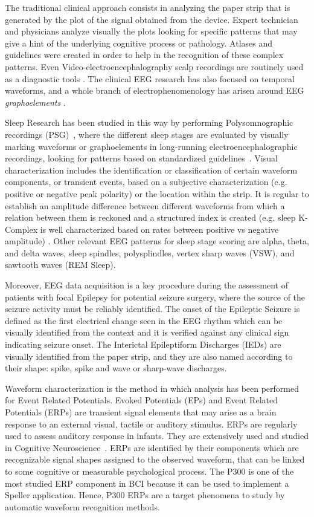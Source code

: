 \documentclass[brainsci,article,submit,moreauthors,pdftex,10pt,a4paper]{mdpi}
\begin{document}
The traditional clinical approach consists in analyzing the paper strip that is generated by the plot of the signal obtained from the device.  Expert technician and physicians analyze visually the plots looking for specific patterns that may give a hint of the underlying cognitive process or pathology.   Atlases and guidelines were created in order to help in the recognition of these complex patterns.   Even Video-electroencephalography scalp recordings are routinely used as a diagnostic tools \citep{Giagante2003} .  The clinical EEG research has also focused on temporal waveforms, and a whole branch of electrophenomenology has arisen around EEG \textit{graphoelements} \citep{Schomer2010}.  

Sleep Research has been studied in this way by performing Polysomnographic recordings (PSG)~\citep{Boostani2017,Rodenbeck2006}, where the different sleep stages are evaluated by visually marking waveforms or graphoelements in long-running electroencephalographic recordings, looking for patterns based on standardized guidelines~\citep{Dimitriadis2018}. Visual characterization includes the identification or classification of certain waveform components, or transient events, based on a subjective characterization (e.g. positive or negative peak polarity) or the location within the strip.  It is regular to establish an amplitude difference between different waveforms from which a relation between them is reckoned and a structured index is created (e.g. sleep K-Complex is well characterized based on rates between positive vs negative amplitude) \citep{Uchida1999}.  Other relevant EEG patterns for sleep stage scoring are alpha, theta, and delta waves,  sleep spindles, polysplindles, vertex sharp waves (VSW), and sawtooth waves (REM Sleep).

Moreover, EEG data acquisition is a key procedure during the assessment of patients with focal Epilepsy for potential seizure surgery, where the source of the seizure activity must be reliably identified. The onset of the Epileptic Seizure is defined as the first electrical change seen in the EEG rhythm which can be visually identified from the context and it is verified against any clinical sign indicating seizure onset.  The Interictal Epileptiform Discharges (IEDs) are visually identified from the paper strip, and they are also named according to their shape: spike, spike and wave or sharp-wave discharges\citep{EEGIntro}.  

Waveform characterization is the method in which analysis has been performed for Event Related Potentials.  Evoked Potentials (EPs) and Event Related Potentials (ERPs) are transient signal elements that may arise as a brain response to an external visual, tactile or auditory stimulus.  ERPs are regularly used to assess auditory response in infants.  They are extensively used and studied in Cognitive Neuroscience~\citep{Luck2005}.  ERPs are identified by their components which are recognizable signal shapes assigned to the observed waveform, that can be linked to some cognitive or measurable psychological process.   The P300 is one of the most studied ERP component in BCI because it can be used to implement a Speller application.  Hence, P300 ERPs are a target phenomena to study by automatic waveform recognition methods.
\end{document}
